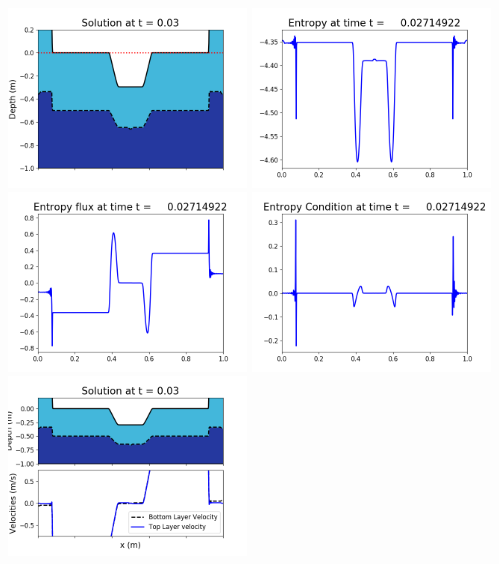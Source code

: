 \documentclass[11pt]{article}
\begin{document}
\includegraphics[width=0.475\textwidth]{frame0063fig1006.png}
\vskip 10pt 
\includegraphics[width=0.475\textwidth]{frame0063fig1007.png}
\includegraphics[width=0.475\textwidth]{frame0063fig1008.png}
\vskip 10pt 
\includegraphics[width=0.475\textwidth]{frame0063fig1009.png}
\vskip 10pt 
\includegraphics[width=0.475\textwidth]{frame0064fig1001.png}
\end{document}
